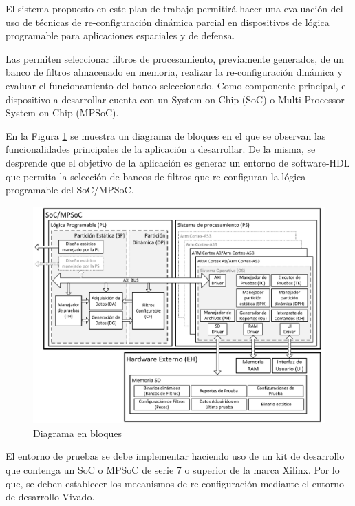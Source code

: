 \documentclass[
11pt, %
]{charter}
\begin{document}
El sistema propuesto en este plan de trabajo permitirá hacer una evaluación del uso de técnicas de re-configuración dinámica parcial en dispositivos de lógica programable para aplicaciones espaciales y de defensa.

Las \ttitle permiten seleccionar filtros de procesamiento, previamente generados, de un banco de filtros almacenado en memoria, realizar la re-configuración dinámica y evaluar el funcionamiento del banco seleccionado. Como componente principal, el dispositivo a desarrollar cuenta con un System on Chip (SoC) o Multi Processor System on Chip (MPSoC).

En la Figura \ref{fig:diagBloques} se muestra un diagrama de bloques en el que se observan las funcionalidades principales de la aplicación a desarrollar. De la misma, se desprende que el objetivo de la aplicación es generar un entorno de software-HDL que permita la selección de bancos de filtros que re-configuran la lógica programable del SoC/MPSoC.

\begin{figure}[h]
\raggedleft
\includegraphics[width=1.05\textwidth]{./Figuras/DiagamaCPR_grande.pdf}
\caption{Diagrama en bloques}
\label{fig:diagBloques}
\end{figure}

El entorno de pruebas se debe implementar haciendo uso de un kit de desarrollo que contenga un SoC o MPSoC de serie 7 o superior de la marca Xilinx. Por lo que, se deben establecer los mecanismos de re-configuración mediante el entorno de desarrollo Vivado.
\end{document}
